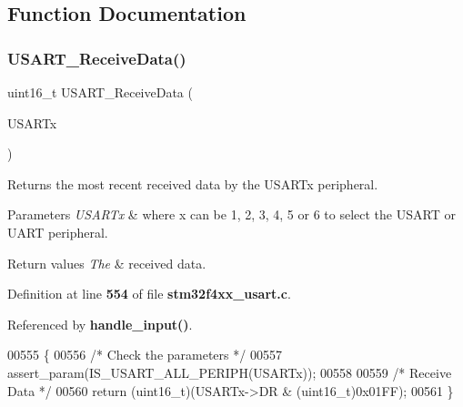 \subsection{Function Documentation}
\mbox{\label{group__USART__Group2_gac67a91845b0b1d54d31bdfb1c5e9867c}} 
\subsubsection{U\+S\+A\+R\+T\+\_\+\+Receive\+Data()}
{\footnotesize\ttfamily uint16\+\_\+t U\+S\+A\+R\+T\+\_\+\+Receive\+Data (\begin{DoxyParamCaption}\item[{\textbf{ U\+S\+A\+R\+T\+\_\+\+Type\+Def} $\ast$}]{U\+S\+A\+R\+Tx }\end{DoxyParamCaption})}



Returns the most recent received data by the U\+S\+A\+R\+Tx peripheral. 


\begin{DoxyParams}{Parameters}
{\em U\+S\+A\+R\+Tx} & where x can be 1, 2, 3, 4, 5 or 6 to select the U\+S\+A\+RT or U\+A\+RT peripheral. \\
\hline
\end{DoxyParams}

\begin{DoxyRetVals}{Return values}
{\em The} & received data. \\
\hline
\end{DoxyRetVals}


Definition at line \textbf{ 554} of file \textbf{ stm32f4xx\+\_\+usart.\+c}.



Referenced by \textbf{ handle\+\_\+input()}.


\begin{DoxyCode}
00555 \{
00556   \textcolor{comment}{/* Check the parameters */}
00557   assert_param(IS_USART_ALL_PERIPH(USARTx));
00558   
00559   \textcolor{comment}{/* Receive Data */}
00560   \textcolor{keywordflow}{return} (uint16\_t)(USARTx->DR & (uint16\_t)0x01FF);
00561 \}
\end{DoxyCode}
\mbox{\label{group__USART__Group2_ga0b43d42da9540f446d494bf69823c6fb}} 
